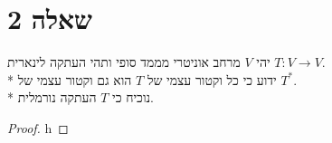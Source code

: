\section{שאלה 2}
יהי $V$ מרחב אוניטרי מממד סופי ותהי העתקה לינארית $T : V \to V$. \\*
ידוע כי כל וקטור עצמי של $T$ הוא גם וקטור עצמי של $T^*$. \\*
נוכיח כי $T$ העתקה נורמלית.
\begin{proof}
	h
\end{proof}


